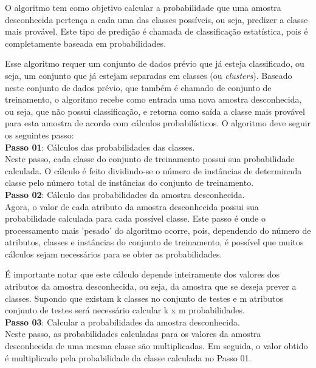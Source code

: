 \documentclass[preprint,12pt]{elsarticle}
\begin{document}
O algoritmo tem como objetivo calcular a probabilidade que uma amostra desconhecida pertença a cada uma das classes possíveis, ou seja, predizer a classe mais provável. Este tipo de predição é chamada de classificação estatística, pois é completamente baseada em probabilidades. 

Esse algoritmo requer um conjunto de dados prévio que já esteja classificado, ou seja, um conjunto que já estejam separadas em classes (ou \textit{clusters}). Baseado neste conjunto de dados prévio, que também é chamado de conjunto de treinamento, o algoritmo recebe como entrada uma nova amostra desconhecida, ou seja, que não possui classificação, e retorna como saída a classe mais provável para esta amostra de acordo com cálculos probabilísticos. O algoritmo deve seguir os seguintes passo:\\


\textbf{Passo 01}: Cálculos das probabilidades das classes.\\

Neste passo, cada classe do conjunto de treinamento possui sua probabilidade calculada. O cálculo é feito dividindo-se o número de instâncias de determinada classe pelo número total de instâncias do conjunto de treinamento.\\

\textbf{Passo 02}: Cálculo das probabilidades da amostra desconhecida.\\

Agora, o valor de cada atributo da amostra desconhecida possui sua probabilidade calculada para cada possível classe. Este passo é onde o processamento mais 'pesado' do algoritmo ocorre, pois, dependendo do número de atributos, classes e instâncias do conjunto de treinamento, é possível que muitos cálculos sejam necessários para se obter as probabilidades.

É importante notar que este cálculo depende inteiramente dos valores dos atributos da amostra desconhecida, ou seja, da amostra que se deseja prever a classes. Supondo que existam k classes no conjunto de testes e m atributos conjunto de testes será necessário calcular k x m probabilidades.\\

\textbf{Passo 03}: Calcular a probabilidades da amostra desconhecida.\\

Neste passo, as probabilidades calculadas para os valores da amostra desconhecida de uma mesma classe são multiplicadas. Em seguida, o valor obtido é multiplicado pela probabilidade da classe calculada no Passo 01.
\end{document}
